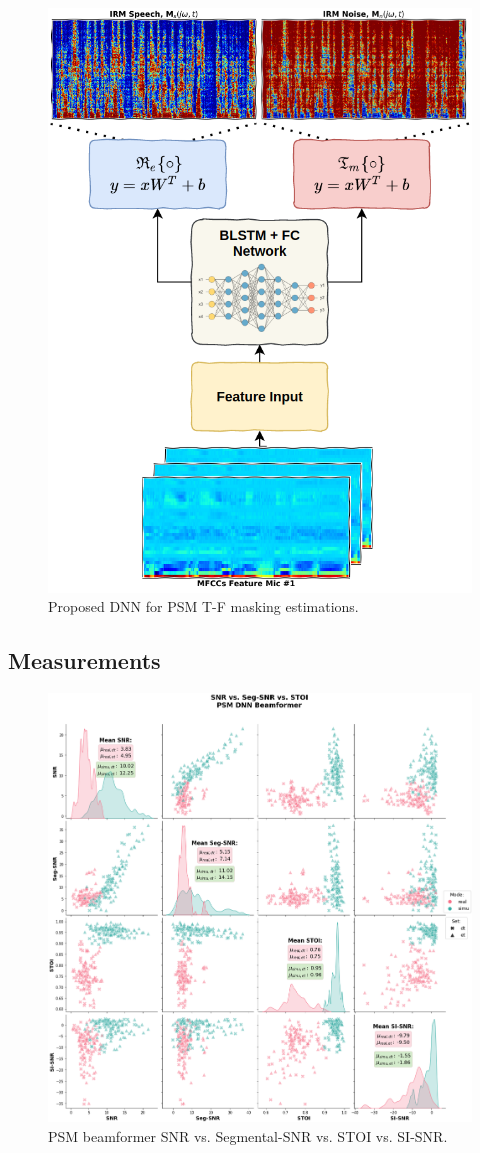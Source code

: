 \begin{figure}[H]
    \centering
    \includegraphics[width=0.75\linewidth]{Beamformers/images/psm_nn}
    \caption{Proposed DNN for PSM T-F masking estimations.}\label{fig:psm_nn}
\end{figure}

\subsection{Measurements}
\begin{figure}[H]
    \centering
    \includegraphics[width=\linewidth]{Features/images/psm_snr_stoi}
    \caption{PSM beamformer SNR vs. Segmental-SNR vs. STOI vs. SI-SNR.}\label{fig:psm_snr_stoi}
\end{figure}

